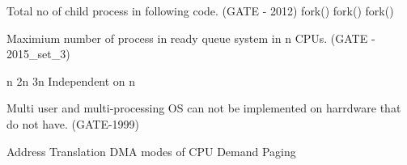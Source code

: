 \vspace{0.08in}

\begin{minipage}{\linewidth}

  \question  Total no of child process in following code. (GATE - 2012) \newline
    fork()  \newline fork()  \newline  fork()

  \begin{oneparchoices}
  \end{oneparchoices}

\end{minipage}

\vspace{0.08in}


\begin{minipage}{\linewidth}

  \question Maximium number of process in ready queue system in n CPUs. (GATE - 2015\_set\_3)

  \begin{oneparchoices}
    \choice n
    \choice 2n
    \choice 3n
    \choice Independent on n
  \end{oneparchoices}

\end{minipage}

\vspace{0.08in}



\begin{minipage}{\linewidth}

  \question  Multi user and multi-processing OS can not be implemented on harrdware that do not have. (GATE-1999)

  \begin{choices}
    \choice Address Translation
    \choice DMA
     modes of CPU
    \choice Demand Paging
  \end{choices}

\end{minipage}

\vspace{0.08in}


